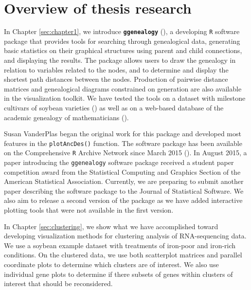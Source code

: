 \documentclass[11pt,a4paper,oldfontcommands,openany]{memoir}
\numberwithin{equation}{section} %
\newcommand{\code}[1]{{\texttt{#1}}}
\newcommand{\pkg}[1]{{\texttt{#1}}}
\begin{document}
\section{Overview of thesis research}


In Chapter \ref{sec:chapter1}, we introduce \textbf{\pkg{ggenealogy}} (\citealt{ggen}), a developing \pkg{R} software package that provides tools for searching through genealogical data, generating basic statistics on their graphical structures using parent and child connections, and displaying the results. The package allows users to draw the genealogy in relation to variables related to the nodes, and to determine and display the shortest path distances between the nodes. Production of pairwise distance matrices and genealogical diagrams constrained on generation are also available in the visualization toolkit. We have tested the tools on a dataset with milestone cultivars of soybean varieties (\citealt{soybean}) as well as on a web-based database of the academic genealogy of mathematicians (\citealt{mgp}).

Susan VanderPlas began the original work for this package and developed most features in the \code{plotAncDes()} function. The software package has been available on the Comprehensive \pkg{R} Archive Network since March 2015 (\citealt{ggen}). In August 2015, a paper introducing the \pkg{ggenealogy} software package received a student paper competition award from the Statistical Computing and Graphics Section of the American Statistical Association. Currently, we are preparing to submit another paper describing the software package to the Journal of Statistical Software. We also aim to release a second version of the package as we have added interactive plotting tools that were not available in the first version.

In Chapter \ref{sec:clustering}, we show what we have accomplished toward developing visualization methods for clustering analysis of RNA-sequencing data. We use a soybean example dataset with treatments of iron-poor and iron-rich conditions. On the clustered data, we use both scatterplot matrices and parallel coordinate plots to determine which clusters are of interest. We also use individual gene plots to determine if there subsets of genes within clusters of interest that should be reconsidered.
\end{document}
